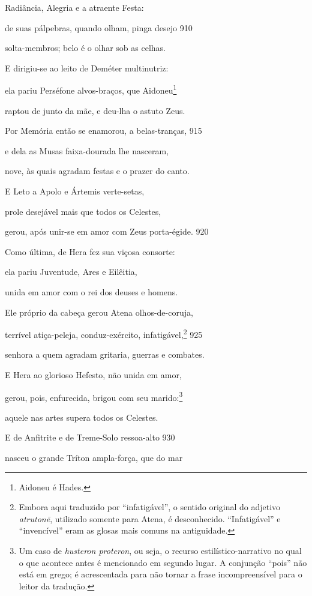 Radiância, Alegria e a atraente Festa:

de suas pálpebras, quando olham, pinga desejo \num{910}

solta-membros; belo é o olhar sob as celhas.

\quad{}E dirigiu-se ao leito de Deméter multinutriz:

ela pariu Perséfone alvos-braços, que Aidoneu\footnote{Aidoneu é Hades.}

raptou de junto da mãe, e deu-lha o astuto Zeus.

\quad{}Por Memória então se enamorou, a belas-tranças, \num{915}

e dela as Musas faixa-dourada lhe nasceram,

nove, às quais agradam festas e o prazer do canto.

\quad{}E Leto a Apolo e Ártemis verte-setas,

prole desejável mais que todos os Celestes,

gerou, após unir-se em amor com Zeus porta-égide. \num{920}

\quad{}Como última, de Hera fez sua viçosa consorte:

ela pariu Juventude, Ares e Eilêitia,

unida em amor com o rei dos deuses e homens.

\quad{}Ele próprio da cabeça gerou Atena olhos-de-coruja,

terrível atiça-peleja, conduz-exército, infatigável,\footnote{Embora aqui traduzido por ``infatigável'', o sentido original do
adjetivo \emph{atrutonē}, utilizado somente para Atena, é desconhecido.
``Infatigável'' e ``invencível'' eram as glosas mais comuns na
antiguidade.} \num{925}

senhora a quem agradam gritaria, guerras e combates.

E Hera ao glorioso Hefesto, não unida em amor,

gerou, pois, enfurecida, brigou com seu marido:\footnote{Um caso de \emph{husteron proteron}, ou seja, o recurso
estilístico-narrativo no qual o que acontece antes é mencionado em
segundo lugar. A conjunção ``pois'' não está em grego; é acrescentada
para não tornar a frase incompreensível para o leitor da tradução.}

aquele nas artes supera todos os Celestes.

\quad{}E de Anfitrite e de Treme-Solo ressoa-alto \num{930}

nasceu o grande Tríton ampla-força, que do mar


